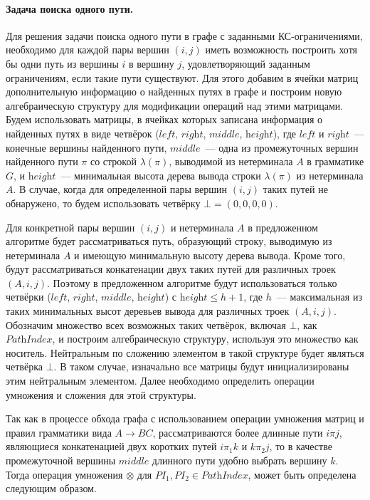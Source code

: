 \paragraph{Задача поиска одного пути.}
Для решения задачи поиска одного пути в графе с заданными КС-ограничениями, необходимо для каждой пары вершин $(i, j)$ иметь возможность построить хотя бы одни путь из вершины $i$ в вершину $j$, удовлетворяющий заданным ограничениям, если такие пути существуют. Для этого добавим в ячейки матриц дополнительную информацию о найденных путях в графе и построим новую алгебраическую структуру для модификации операций над этими матрицами. Будем использовать матрицы, в ячейках которых записана информация о найденных путях в виде четвёрок ($\textit{left}$, $\textit{right}$, $\textit{middle}$, $\textit{height}$), где $\textit{left}$ и $\textit{right}$~--- конечные вершины найденного пути, $\textit{middle}$~--- одна из промежуточных вершин найденного пути $\pi$ со строкой $\lambda(\pi)$, выводимой из нетерминала $A$ в грамматике $G$, и $\textit{height}$~--- минимальная высота дерева вывода строки $\lambda(\pi)$ из нетерминала $A$. В случае, когда для определенной пары вершин $(i, j)$ таких путей не обнаружено, то будем использовать четвёрку $\bot = (0, 0, 0, 0)$. 

Для конкретной пары вершин $(i, j)$ и нетерминала $A$ в предложенном алгоритме будет рассматриваться путь, образующий строку, выводимую из нетерминала $A$ и имеющую минимальную высоту дерева вывода. Кроме того, будут рассматриваться конкатенации двух таких путей для различных троек $(A, i, j)$. Поэтому в предложенном алгоритме будут использоваться только четвёрки ($\textit{left}$, $\textit{right}$, $\textit{middle}$, $\textit{height}$) с $\textit{height} \leq h + 1$, где $h$~--- максимальная из таких минимальных высот деревьев вывода для различных троек $(A, i, j)$. Обозначим множество всех возможных таких четвёрок, включая $\bot$, как $\textit{PathIndex}$, и построим алгебраическую структуру, используя это множество как носитель. Нейтральным по сложению элементом в такой структуре будет являться четвёрка $\bot$. В таком случае, изначально все матрицы будут инициализированы этим нейтральным элементом. Далее необходимо определить операции умножения и сложения для этой структуры.

Так как в процессе обхода графа с использованием операции умножения матриц и правил грамматики вида $A \to B C$, рассматриваются более длинные пути $i \pi j$, являющиеся конкатенацией двух коротких путей $i\pi_1 k$ и $k \pi_2 j$, то в качестве промежуточной вершины $\textit{middle}$ длинного пути удобно выбрать вершину $k$. Тогда операция умножения $\otimes$ для \mbox{$\textit{PI}_1, \textit{PI}_2 \in \textit{PathIndex}$}, может быть определена следующим образом.


